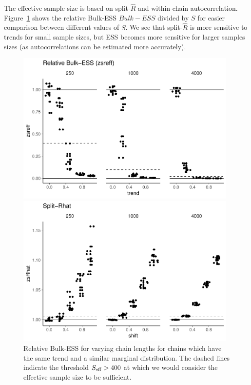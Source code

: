 \documentclass[american,]{article}
\begin{document}
The effective sample size is based on split-\(\widehat{R}\) and
within-chain autocorrelation. Figure~\ref{fig:zsreff-same-trend-1}
shows the relative Bulk-ESS \(Bulk-ESS\) divided by \(S\) for easier
comparison between different values of \(S\).
We see that split-\(\widehat{R}\) is more sensitive to trends for
small sample sizes, but ESS becomes more sensitive for larger samples
sizes (as autocorrelations can be estimated more accurately).
\begin{figure}[tp]
  \centering
  \begin{minipage}{0.48\textwidth}
  \includegraphics[width=0.98\textwidth]{graphics/zsreff-same-trend-1.pdf}
  \caption{Relative Bulk-ESS for varying chain lengths for chains which have
    the same trend and a similar marginal distribution. The dashed
    lines indicate the threshold \(S_{\rm eff} > 400\) at which we
    would consider the effective sample size to be sufficient.}
  \label{fig:zsreff-same-trend-1}
\end{minipage}
\hfill
  \begin{minipage}{0.48\textwidth}
  \includegraphics[width=0.98\textwidth]{graphics/zsrhat-shifted-chain-1.pdf}

\end{minipage}
\end{figure}
\end{document}
